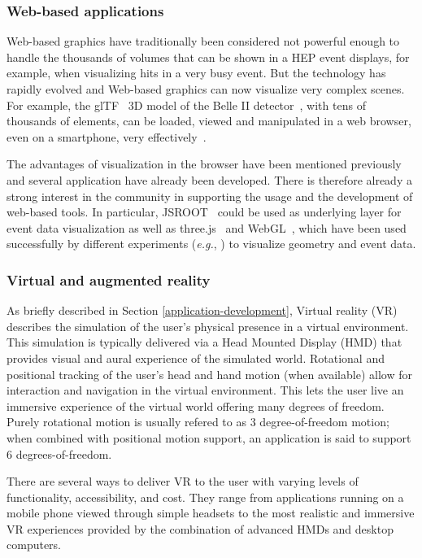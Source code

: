 \documentclass[12pt,a4paper]{article}
\begin{document}
\hypertarget{web-based}{%
\subsubsection{Web-based applications}\label{web-based}}

Web-based graphics have traditionally been considered not powerful enough to handle the thousands of volumes that can be
shown in a HEP event displays, for example, when visualizing hits in a very busy event. But the technology has rapidly
evolved and Web-based graphics can now visualize very complex scenes.
For example, the glTF~\cite{glTF} 3D model of the Belle II detector~\cite{BelleII}, with tens of thousands of elements,
can be loaded, viewed and manipulated in a web browser, even on a smartphone, very effectively~\cite{SketchFabBelleII}.


The advantages of visualization in the browser have been mentioned
previously and several application have already been developed.
There is therefore already a strong interest in the community in supporting the usage and the development of web-based tools.
In particular, JSROOT~\cite{rootjs} could be used as
underlying layer for event data visualization as well as three.js~\cite{ThreeJS} and WebGL~\cite{WebGL2011}, which have been
used successfully by different experiments (\textit{e.g.}, \cite{ATLASTada2016,ATLASTracer2015,CMSISpyWebGL}) to visualize geometry and event data.

\hypertarget{vr}{%
\subsubsection{Virtual and augmented reality}\label{vr}}

As briefly described in Section \ref{application-development}, Virtual reality (VR) describes the simulation of the user’s
physical presence in a virtual environment. This simulation
is typically delivered via a Head Mounted Display (HMD) that provides visual and aural experience of the simulated world.
Rotational and positional tracking of the user’s head and hand motion (when available) allow for interaction and navigation
in the virtual environment. This lets the user live an immersive experience of the virtual world offering many degrees of freedom. Purely rotational motion is usually refered to as
3 degree-of-freedom motion; when combined with positional motion support, an application is said to support 6 degrees-of-freedom.

There are several ways to deliver VR to the user with varying levels of functionality, accessibility, and cost.
They range from applications running on a mobile phone viewed through simple headsets to the most realistic and
immersive VR experiences provided by the combination of advanced HMDs and desktop computers.
\end{document}
